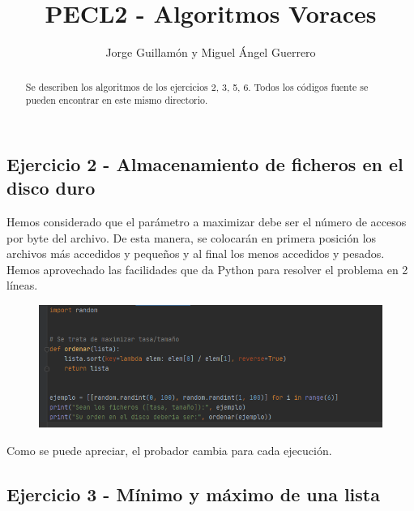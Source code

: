 \documentclass[]{report}
\title{PECL2 - Algoritmos Voraces}
\author{Jorge Guillamón y Miguel Ángel Guerrero}
\begin{document}
\maketitle

\begin{abstract}
	Se describen los algoritmos de los ejercicios 2, 3, 5, 6. Todos los códigos fuente se pueden encontrar en este mismo directorio.
\end{abstract}

\subsection*{Ejercicio 2 - Almacenamiento de ficheros en el disco duro}
Hemos considerado que el parámetro a maximizar debe ser el número de accesos por byte del archivo. De esta manera, se colocarán en primera posición los archivos más accedidos y pequeños y al final los menos accedidos y pesados.\\
Hemos aprovechado las facilidades que da Python para resolver el problema en 2 líneas.
\begin{figure}[h!]
	\centering
	\includegraphics[width=1\linewidth]{1}
	\caption{}
	\label{fig:1}
\end{figure}

Como se puede apreciar, el probador cambia para cada ejecución.
\newpage

\subsection*{Ejercicio 3 - Mínimo y máximo de una lista}
\end{document}

